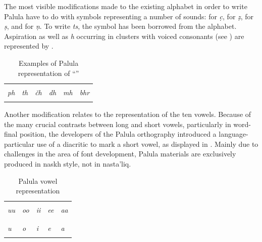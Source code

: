 The most visible modifications made to the existing \iliUrdu alphabet in order to write Palula have to do with symbols representing a number of  sounds: {\large{}}  for \textit{c̣}, {\large{}} for \textit{ẓ}, {\large{}} for \textit{ṣ}, and {\large{}} for \textit{ṇ}. To write \textit{ts}, the symbol {\large{}} has been borrowed from the \iliPashto alphabet. Aspiration as well as \textit{h} occurring in clusters with voiced consonants (see ) are represented by {\large{}}.


\begin{table}
\caption{Examples of Palula representation of ``''}
\begin{tabularx}{\textwidth}{ Q Q Q Q Q Q }
\lsptoprule
\LARGE{}
&\LARGE{}
&\LARGE{}
&\LARGE{}
&\LARGE{}
&\LARGE{}\\
\textit{ph} &
\textit{th} &
\textit{čh} &
\textit{dh} &
\textit{mh} &
\textit{bhr}\\\lspbottomrule
\end{tabularx}
\label{tab:1-4bb}
\end{table}


Another modification relates to the representation of the ten vowels. Because of the many crucial contrasts between long and short vowels, particularly in word-final position, the developers of the Palula orthography introduced a language-particular use of a diacritic {\large{}} to mark a short vowel, as displayed in . Mainly due to challenges in the area of font development, Palula materials are exclusively produced in naskh style, not in nasta’liq.


\begin{table}
\caption{Palula vowel representation}
\begin{tabularx}{\textwidth}{ Q Q Q Q Q }
\lsptoprule
\LARGE{}
&\LARGE{}
&\LARGE{}
&\LARGE{}
&\LARGE{}\\
\textit{uu} &
\textit{oo} &
\textit{ii} &
\textit{ee} &
\textit{aa}\\
\\
\LARGE{}
&\LARGE{}
&\LARGE{}
&\LARGE{}
&\LARGE{}\\
\textit{u} &
\textit{o} &
\textit{i} &
\textit{e} &
\textit{a}\\\lspbottomrule
\end{tabularx}
\label{tab:1-4c}
\end{table}


